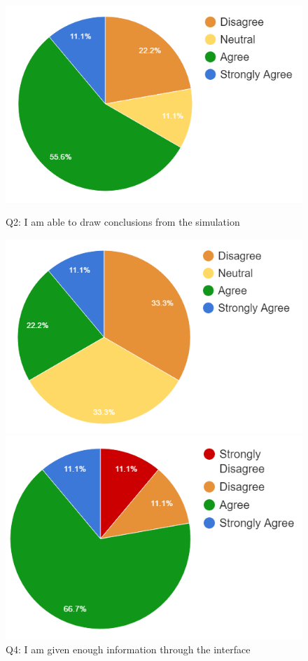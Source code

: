 \begin{figure}[h]
	\centering
	\begin{minipage}[b]{0.45\textwidth}
		\includegraphics[scale=0.6]{images/q3}
		\caption{\label{fig:simfeed1}Q2: I am able to draw conclusions from the simulation}
	\end{minipage}
	\hfill
	\begin{minipage}[b]{0.45\textwidth}
		\includegraphics[scale=0.6]{images/q4}
		\caption{\label{fig:simfeed2}Q4: I am given enough information through the interface}
	\end{minipage}
	\newline
	\begin{minipage}[b]{0.45\textwidth}
		\includegraphics[scale=0.6]{images/q5}

\end{minipage}
\end{figure}
